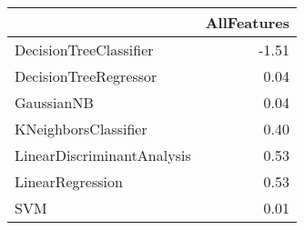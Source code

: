 \begin{tabular}{lr}
\toprule
{} &  AllFeatures \\
\midrule
DecisionTreeClassifier     &        -1.51 \\
DecisionTreeRegressor      &         0.04 \\
GaussianNB                 &         0.04 \\
KNeighborsClassifier       &         0.40 \\
LinearDiscriminantAnalysis &         0.53 \\
LinearRegression           &         0.53 \\
SVM                        &         0.01 \\
\bottomrule
\end{tabular}
